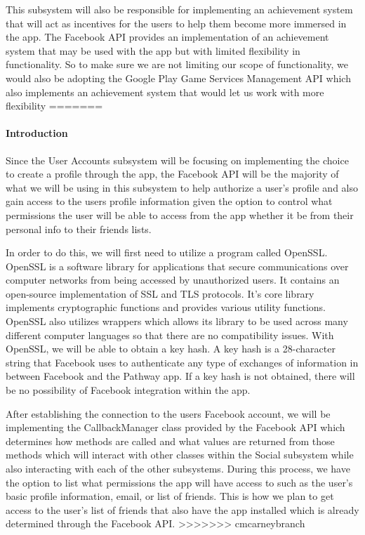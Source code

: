\documentclass{article}
\begin{document}
This subsystem will also be responsible for implementing an achievement system that will act as incentives for the users to help them become more immersed in the app. The Facebook API provides an implementation of an achievement system that may be used with the app but with limited flexibility in functionality. So to make sure we are not limiting our scope of functionality, we would also be adopting the Google Play Game Services Management API which also implements an achievement system that would let us work with more flexibility
=======
\paragraph{Introduction}                                                                                                                                                                 
Since the User Accounts subsystem will be focusing on implementing the choice to create a profile through the app, the Facebook API will be the majority of what we will be using in this subsystem to help authorize a user’s profile and also gain access to the users profile information given the option to control what permissions the user will be able to access from the app whether it be from their personal info to their friends lists.

In order to do this, we will first need to utilize a program called OpenSSL. OpenSSL is a software library for applications that secure communications over computer networks from being accessed by unauthorized users. It contains an open-source implementation of SSL and TLS protocols. It's core library implements cryptographic functions and provides various utility functions. OpenSSL also utilizes wrappers which allows its library to be used across many different computer languages so that there are no compatibility issues. With OpenSSL, we will be able to obtain a key hash. A key hash is a 28-character string that Facebook uses to authenticate any type of exchanges of information in between Facebook and the Pathway app. If a key hash is not obtained, there will be no possibility of Facebook integration within the app. 

After establishing the connection to the users Facebook account, we will be implementing the CallbackManager class provided by the Facebook API which determines how methods are called and what values are returned from those methods which will interact with other classes within the Social subsystem while also interacting with each of the other subsystems. During this process, we have the option to list what permissions the app will have access to such as the user's basic profile information, email, or list of friends. This is how we plan to get access to the user's list of friends that also have the app installed which is already determined through the Facebook API.
>>>>>>> cmcarneybranch
\end{document}
